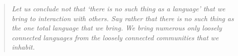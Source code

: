 \begin{quote}
\emph{Let us conclude not that ‘there is no such thing as a language’ that we bring to interaction with others. Say rather that there is no such thing as the one total language that we bring. We bring numerous only loosely connected languages from the loosely connected communities that we inhabit.} \cite{hacking1986nice}
\end{quote}
